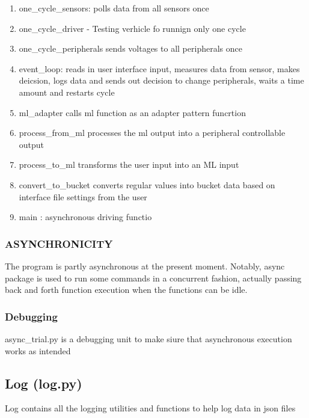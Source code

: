 \documentclass[
]{article}
\providecommand{\tightlist}{%
  \setlength{\itemsep}{0pt}\setlength{\parskip}{0pt}}
\begin{document}
\begin{enumerate}
\def\labelenumi{\arabic{enumi}.}
\tightlist
\item
  one\_cycle\_sensors: polls data from all sensors once
\item
  one\_cycle\_driver - Testing verhicle fo runnign only one cycle
\item
  one\_cycle\_peripherals sends voltages to all peripherals once
\item
  event\_loop: reads in user interface input, measures data from sensor,
  makes deicsion, logs data and sends out decision to change
  peripherals, waits a time amount and restarts cycle
\item
  ml\_adapter calls ml function as an adapter pattern funcrtion
\item
  process\_from\_ml processes the ml output into a peripheral
  controllable output
\item
  process\_to\_ml transforms the user input into an ML input
\item
  convert\_to\_bucket converts regular values into bucket data based on
  interface file settings from the user
\item
  main : asynchronous driving functio
\end{enumerate}

\hypertarget{asynchronicity}{%
\subsubsection{ASYNCHRONICITY}\label{asynchronicity}}

The program is partly asynchronous at the present moment. Notably, async
package is used to run some commands in a concurrent fashion, actually
passing back and forth function execution when the functions can be
idle.

\hypertarget{debugging}{%
\subsubsection{Debugging}\label{debugging}}

async\_trial.py is a debugging unit to make siure that asynchronous
execution works as intended

\hypertarget{log-log.py}{%
\subsection{Log (log.py)}\label{log-log.py}}

Log contains all the logging utilities and functions to help log data in
json files
\end{document}
